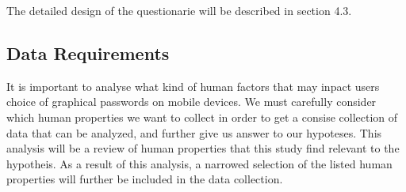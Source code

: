     The detailed design of the questionarie will be described in section 4.3.

  \subsection{Data Requirements}
  
  It is important to analyse what kind of human factors that may inpact users choice of graphical passwords on mobile devices. We must carefully consider which human properties we want to collect in order to get a consise collection of data that can be analyzed, and further give us answer to our hypoteses. This analysis will be a review of human properties that this study find relevant to the hypotheis. As a result of this analysis, a narrowed selection of the listed human properties will further be included in the data collection.  

